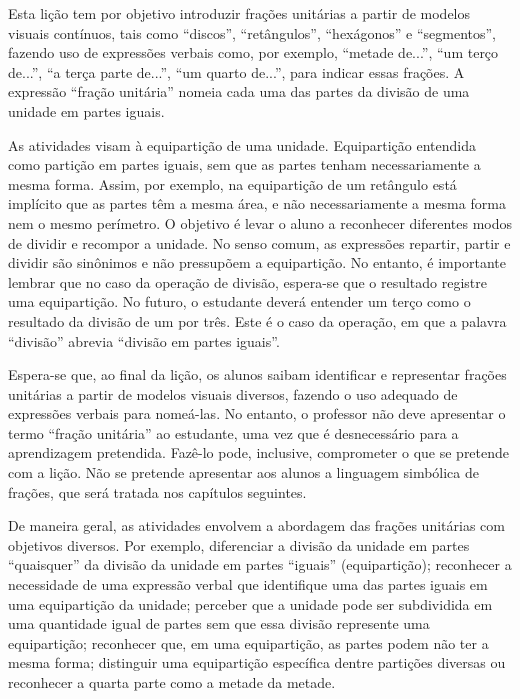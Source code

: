 


\noindent {\color{special}{\Large \bf Para o professor}}
\vspace{.5cm}

Esta lição tem por objetivo introduzir frações unitárias a partir de modelos visuais contínuos, tais como ``discos'', ``retângulos'', ``hexágonos'' e ``segmentos'', fazendo uso de expressões verbais como, por exemplo, ``metade de...'', ``um terço de...'', ``a terça parte de...'', ``um quarto de...'', para indicar essas frações. 
A expressão ``fração unitária'' nomeia cada uma das partes da divisão de uma unidade em partes iguais.

As atividades visam à equipartição de uma unidade. Equipartição entendida como partição em partes iguais, sem que as partes tenham necessariamente a mesma forma. Assim, por exemplo, na equipartição de um retângulo está implícito que as partes têm a mesma área, e não necessariamente a mesma forma nem o mesmo perímetro. O objetivo é levar o aluno a reconhecer diferentes modos de dividir e recompor a unidade. No senso comum, as expressões repartir, partir e dividir são sinônimos e não pressupõem a equipartição. No entanto, é importante lembrar que no caso da operação de divisão, espera-se que o resultado registre uma equipartição. No futuro, o estudante deverá entender um terço como o resultado da divisão de um por três. Este é o caso da operação, em que a palavra ``divisão'' abrevia ``divisão em partes iguais''.

Espera-se que, ao final da lição, os alunos saibam identificar e representar frações unitárias a partir de modelos visuais diversos, fazendo o uso adequado de expressões verbais para nomeá-las. No entanto, o professor não deve apresentar o termo ``fração unitária'' ao estudante, uma vez que é desnecessário para a aprendizagem pretendida. Fazê-lo pode, inclusive, comprometer o que se pretende com a lição. Não se pretende apresentar aos alunos a linguagem simbólica de frações, que será tratada nos capítulos seguintes.

De maneira geral, as atividades envolvem a abordagem das frações unitárias com objetivos diversos. Por exemplo, diferenciar a divisão da unidade em partes ``quaisquer'' da divisão da unidade em partes ``iguais'' (equipartição); reconhecer a necessidade de uma expressão verbal que identifique uma das partes iguais em uma equipartição da unidade; perceber que a unidade pode ser subdividida em uma quantidade igual de partes sem que essa divisão represente uma equipartição; reconhecer que, em uma equipartição, as partes podem não ter a mesma forma; distinguir uma equipartição específica dentre partições diversas ou reconhecer a quarta parte como a metade da metade.

